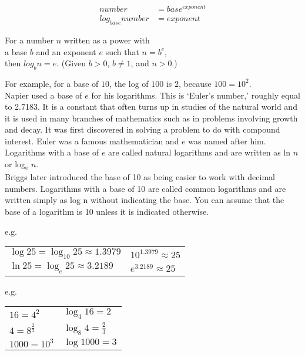 \documentclass{article}
\begin{document}
\begin{Large}
\begin{align*}
number &= base^{exponent}\\
log_{base} number &= exponent
\end{align*}
\end{Large}

For a number $n$ written as a power with\\ a base $b$ and an exponent $e$ such that $n = b^e$,\\ then $log_b n = e$. (Given $b>0$, $b\neq1$, and $n>0$.)

\newpage

For example, for a base of $10$, the log of $100$ is $2$, because $100 = 10^2$.\\

Napier used a base of $e$ for his logarithms. This is ‘Euler’s number,’ roughly equal to 2.7183. It is a constant that often turns up in studies of the natural world and it is used in many branches of mathematics such as in problems involving growth and decay. It was first discovered in solving a problem to do with compound interest. Euler was a famous mathematician and $e$ was named after him. Logarithms with a base of $e$ are called natural logarithms and are written as ln $n$ or log\textsubscript{e} $n$.\\

Briggs later introduced the base of 10 as being easier to work with decimal numbers. Logarithms with a base of 10 are called common logarithms and are written simply as log n without indicating the base. You can assume that the base of a logarithm is 10 unless it is indicated otherwise.

\begin{center}
e.g.
\begin{tabular}{ l l }
$\log{25}=\log_{10}25\approx1.3979$ & $10^{1.3979}\approx25$\\
$\ln 25=\log_{e}25\approx3.2189$ & $e^{3.2189}\approx25$\\
\end{tabular}
\end{center}

\begin{center}
e.g.
\begin{tabular}{ l l }
$16 = 4^2$ & $\log_4{16}=2$\\
$4 = 8^{\frac{2}{3}}$ & $\log_8{4}=\frac{2}{3}$\\
$1000 = 10^3$ & $\log{1000}=3$
\end{tabular}
\end{center}
\end{document}
